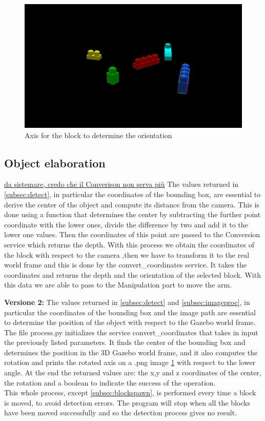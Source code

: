 \documentclass[12pt,a4paper]{article}
\begin{document}
\begin{center}
    \begin{figure}
        \centering
        \includegraphics[width=1.0\columnwidth]{images/Obj1.png}
        \caption{Axis for the block to determine the orientation}
        \label{fig:obj1}
    \end{figure}
\end{center}
\subsection{Object elaboration}\label{subsec:objel}
\uline{da sistemare, credo che il Converison non serva più}
The values returned in \ref{subsec:detect}, in particular the coordinates of the bounding box, are essential to derive the center of the object and compute its distance from the camera. This is done using a function that determines the center by subtracting the further point coordinate with the lower ones, divide the difference by two and add it to the lower one values. Then the coordinates of this point are passed to the Conversion service which returns the depth. With this process we obtain the coordinates of the block with respect to the camera ,then we have to transform it to the real world frame and this is done by the convert\_coordinates service. It takes the coordinates and returns the depth and the orientation of the selected block. With this data we are able to pass to the Manipulation part to move the arm.

\textbf{Versione 2:} The values returned in \ref{subsec:detect} and \ref{subsec:imageproc}, in particular the coordinates of the bounding box and the image path are essential to determine the position of the object with respect to the Gazebo world frame. The file process.py initializes the service convert\_coordinates that takes in input the previously listed parameters. It finds the center of the bounding box and determines the position in the 3D Gazebo world frame, and it also computes the rotation and prints the rotated  axis on a .png image \ref{fig:obj1} with respect to the lower angle. At the end the returned values are: the x,y and z coordinates of the center, the rotation and a boolean to indicate the success of the operation.\\
This whole process, except \ref{subsec:blockspawn}, is performed every time a block is moved, to avoid detection errors. The program will stop when all the blocks have been moved successfully and so the detection process gives no result.
\end{document}
